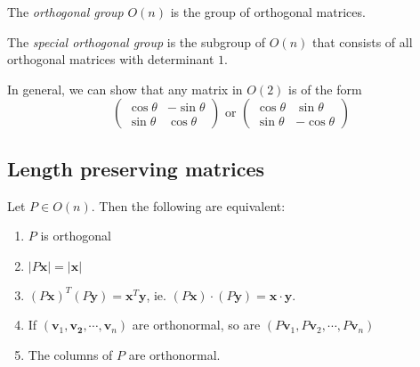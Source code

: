 \documentclass[a4paper]{article}
\begin{document}
\begin{defi}
  The \emph{orthogonal group} $O(n)$ is the group of orthogonal matrices.
\end{defi}

\begin{defi}
  The \emph{special orthogonal group} is the subgroup of $O(n)$ that consists of all orthogonal matrices with determinant $1$.
\end{defi}

In general, we can show that any matrix in $O(2)$ is of the form
\[
  \begin{pmatrix}
    \cos\theta & -\sin\theta\\
    \sin\theta & \cos\theta
  \end{pmatrix}\text{ or }
  \begin{pmatrix}
    \cos\theta & \sin\theta\\
    \sin\theta & -\cos\theta
  \end{pmatrix}
\]
\subsection{Length preserving matrices}
\begin{thm}
  Let $P\in O(n)$. Then the following are equivalent:
  \begin{enumerate}
    \item $P$ is orthogonal
    \item $|P\mathbf{x}| = |\mathbf{x}|$
    \item $(P\mathbf{x})^T(P\mathbf{y}) = \mathbf{x}^T\mathbf{y}$, ie. $(P\mathbf{x})\cdot(P\mathbf{y}) = \mathbf{x}\cdot \mathbf{y}$.
    \item If $(\mathbf{v}_1, \mathbf{v_2}, \cdots, \mathbf{v}_n)$ are orthonormal, so are $(P\mathbf{v}_1, P\mathbf{v}_2, \cdots, P\mathbf{v}_n)$
    \item The columns of $P$ are orthonormal. 
  \end{enumerate}
\end{thm}
\end{document}
